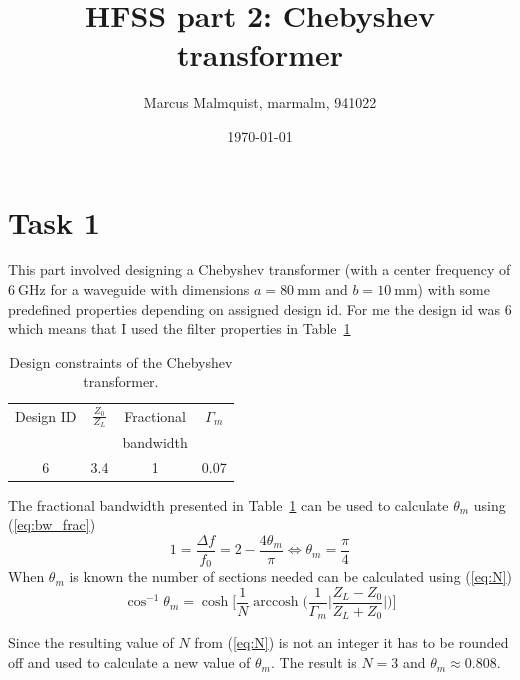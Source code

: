 \documentclass[12pt,a4paper]{article}
\title{HFSS part 2: Chebyshev transformer}
\author{Marcus Malmquist, marmalm, 941022}
\date{\today}
\DeclareMathOperator{\acosh}{arccosh}
\begin{document}
\maketitle

\section{Task 1}\label{sec:1}
This part involved designing a Chebyshev transformer (with a center frequency of $\SI{6}{\giga\hertz}$ for a waveguide with dimensions $a=\SI{80}{\milli\metre}$ and $b=\SI{10}{\milli\metre}$) with some predefined properties depending on assigned design id. For me the design id was 6 which means that I used the filter properties in Table~\ref{tab:filter_prop}

\begin{table}
  \centering
  \caption{Design constraints of the Chebyshev transformer.}
  \begin{tabular}{|c|c|c|c|}\hline
    Design ID & $\frac{Z_0}{Z_L}$ & Fractional & $\Gamma_m$ \\
     & & bandwidth & \\ \hline
    6 & 3.4 & 1 & 0.07 \\ \hline
  \end{tabular}
  \label{tab:filter_prop}
\end{table}
\noindent The fractional bandwidth presented in Table~\ref{tab:filter_prop} can be used to calculate $\theta_m$ using (\ref{eq:bw_frac})
\begin{equation}
  1=\dfrac{\Delta f}{f_0}=2-\dfrac{4\theta_m}{\pi}\Leftrightarrow \theta_m=\dfrac{\pi}{4}
  \label{eq:bw_frac}
\end{equation}
When $\theta_m$ is known the number of sections needed can be calculated using (\ref{eq:N})
\begin{equation}
  \cos^{-1}{\theta_m}=\cosh\Big[\dfrac{1}{N}\acosh\Big(\dfrac{1}{\Gamma_m}\Big|\dfrac{Z_L-Z_0}{Z_L+Z_0}\Big|\Big)\Big] 
  \label{eq:N}
\end{equation}

Since the resulting value of $N$ from (\ref{eq:N}) is not an integer it has to be rounded off and used to calculate a new value of $\theta_m$. The result is $N=3$ and $\theta_m\approx 0.808$.
\end{document}
